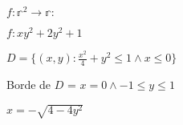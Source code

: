 \documentclass[../parcial.tex]{subfiles}
\begin{document}
    $f: \mathbb{r}^2 \to \mathbb{r}: $

    $f:xy^2+2y^2+1$

    $D = \{(x,y): \frac{x^2}{4} + y^2 \leq 1 \wedge x\leq 0\}$

    Borde de $D$ = $ x = 0 \wedge -1 \leq y \leq 1$

            $ x = -\sqrt{4-4y^2} $

        
\end{document}
